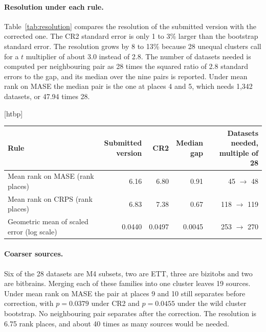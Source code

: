 \documentclass{article}
\makeatletter
\renewenvironment{table}
  {\setlength{\abovecaptionskip}{6\p@}%
   \setlength{\belowcaptionskip}{\z@}%
   \@float{table}}
  {\end@float}
\makeatother
\begin{document}
\paragraph{Resolution under each rule.} Table~\ref{tab:resolution} compares the resolution of
the submitted version with the corrected one. The CR2 standard error is only 1 to 3\% larger
than the bootstrap standard error. The resolution grows by 8 to 13\% because 28 unequal
clusters call for a $t$ multiplier of about 3.0 instead of 2.8. The number of datasets needed
is computed per neighbouring pair as 28 times the squared ratio of 2.8 standard errors to the
gap, and its median over the nine pairs is reported. Under mean rank on MASE the median pair is
the one at places 4 and 5, which needs 1{,}342 datasets, or 47.94 times 28.

\begin{table}[htbp]
\centering
\small
\begin{tabular}{@{}lrrrr@{}}
\toprule
Rule & \shortstack[r]{Submitted\\version} & CR2 & \shortstack[r]{Median\\gap} &
\shortstack[r]{Datasets needed,\\multiple of 28} \\
\midrule
Mean rank on MASE (rank places) & 6.16 & 6.80 & 0.91 & 45 $\to$ 48 \\
Mean rank on CRPS (rank places) & 6.83 & 7.38 & 0.67 & 118 $\to$ 119 \\
Geometric mean of scaled error (log scale) & 0.0440 & 0.0497 & 0.0045 & 253 $\to$ 270 \\
\bottomrule
\end{tabular}
\caption{Resolution of GIFT-Eval under each rule, under the submitted version's 2.8 bootstrap
standard errors and under CR2, against the median gap between displayed neighbours. The last
column gives the datasets needed for the median gap, under the submitted version and then
under CR2. Under the geometric mean the resolution uses that rule's own top ten.}
\label{tab:resolution}
\end{table}

\paragraph{Coarser sources.} Six of the 28 datasets are M4 subsets, two are ETT, three are
bizitobs and two are bitbrains. Merging each of these families into one cluster leaves 19
sources. Under mean rank on MASE the pair at places 9 and 10 still separates before
correction, with $p = 0.0379$ under CR2 and $p = 0.0455$ under the wild cluster bootstrap. No
neighbouring pair separates after the correction. The resolution is 6.75 rank places, and
about 40 times as many sources would be needed.
\end{document}
